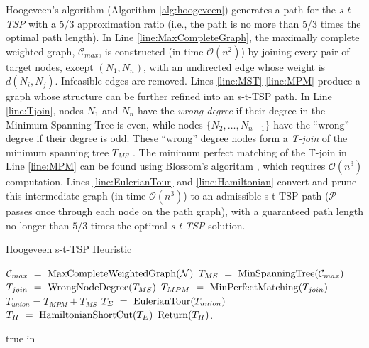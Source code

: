 \documentclass[letterpaper, 10 pt, conference]{ieeeconf}
\theoremstyle{definition}
\newcommand{\Os}{\mathcal{O}}
\newcommand{\Ps}{\mathcal{P}}
\begin{document}
\noindent Hoogeveen's \cite{hoogeveen_analysis_1991} algorithm (Algorithm \ref{alg:hoogeveen}) generates a path for the {\em s-t-TSP} with a 5/3 approximation ratio (i.e., the path is no more than 5/3 times the optimal path length).  In Line \ref{line:MaxCompleteGraph}, the maximally complete weighted graph, $\mathcal{C}_{max}$, is constructed (in time $\Os(n^2)$) by joining every pair of target nodes, except $(N_1,N_n)$, with an undirected edge whose weight is $d(N_i,N_j)$.  Infeasible edges are removed.  Lines \ref{line:MST}-\ref{line:MPM} produce a graph whose structure can be further refined into an s-t-TSP path.  In Line \ref{line:Tjoin}, nodes $N_1$ and $N_n$ have the {\em wrong degree} if their degree in the
Minimum Spanning Tree is even, while nodes $\{N_2,\ldots,N_{n-1}\}$ have the ``wrong'' degree if their degree is odd.  These ``wrong'' degree nodes form a {\em T-join} of the minimum spanning tree $T_{MS}$ \cite{gao_metric_2018}. The minimum perfect matching of the T-join in Line \ref{line:MPM} can be found using
Blossom's algorithm \cite{kolmogorov_blossom_2009}, which requires $\mathcal{O}(n^3)$ computation. Lines \ref{line:EulerianTour} and \ref{line:Hamiltonian} convert and prune this intermediate graph (in time $\Os(n^3)$) to an admissible s-t-TSP path ($\Ps$ passes once through each node on the path graph), with a guaranteed path length no longer than $5/3$ times the optimal {\em s-t-TSP} solution.
%
\begin{algorithm}[htb]
\caption{Hoogeveen s-t-TSP Heuristic}
\begin{small}
\begin{algorithmic}[1]
\State $\mathcal{C}_{max}\ =\ {\rm MaxCompleteWeightedGraph}(\mathcal{N})$ \label{line:MaxCompleteGraph}
\State $T_{MS}\ =\ {\rm MinSpanningTree}(\mathcal{C}_{max})$ \label{line:MST}
\State $T_{join}\ =\ {\rm WrongNodeDegree}(T_{MS})$ \label{line:Tjoin}
\State $T_{MPM}\ =\ {\rm MinPerfectMatching}(T_{join})$ \label{line:MPM}
\State $T_{union} = T_{MPM} + T_{MS}$    \label{line:union}
\State $T_{E}\ =\ {\rm EulerianTour}(T_{union})$ \label{line:EulerianTour}
\State $T_H\ =\ {\rm HamiltonianShortCut}(T_{E})$ \label{line:Hamiltonian}
\State ${\rm Return}(T_H)$.
\EndProcedure
\end{algorithmic}
\end{small}
\label{alg:hoogeveen}
\end{algorithm}
%
 true in
\end{document}
